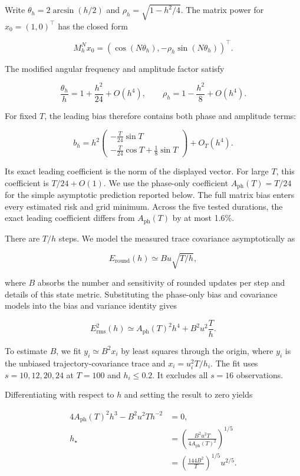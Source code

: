 \documentclass[
11pt
]{article}
\begin{document}
Write \(\theta_h=2\arcsin(h/2)\) and
\(\rho_h=\sqrt{1-h^2/4}\). The matrix power for \(x_0=(1,0)^\top\)
has the closed form

\[
M_h^Nx_0=(\cos(N\theta_h),-\rho_h\sin(N\theta_h))^\top.
\]

The modified angular frequency and amplitude factor satisfy

\[
\frac{\theta_h}{h}=1+\frac{h^2}{24}+O(h^4),
\qquad \rho_h=1-\frac{h^2}{8}+O(h^4).
\]

For fixed \(T\), the leading bias therefore contains both phase and
amplitude terms:

\[
b_h=h^2\begin{pmatrix}
-\frac{T}{24}\sin T\\[2pt]
-\frac{T}{24}\cos T+\frac18\sin T
\end{pmatrix}+O_T(h^4).
\]

Its exact leading coefficient is the norm of the displayed vector. For
large \(T\), this coefficient is \(T/24+O(1)\). We use the phase-only
coefficient \(A_{\mathrm{ph}}(T)=T/24\) for the simple asymptotic
prediction reported below. The full matrix bias enters every estimated
risk and grid minimum. Across the five tested durations, the exact
leading coefficient differs from \(A_{\mathrm{ph}}(T)\) by at most
1.6\%.

There are \(T/h\) steps. We model the measured trace covariance
asymptotically as

\[
E_{\mathrm{round}}(h)\simeq Bu\sqrt{T/h},
\]

where \(B\) absorbs the number and sensitivity of rounded updates per
step and details of this state metric. Substituting the phase-only bias
and covariance models into the bias and variance identity gives

\[
E_{\mathrm{rms}}^2(h)\simeq A_{\mathrm{ph}}(T)^2h^4+B^2u^2\frac{T}{h}.
\]

To estimate \(B\), we fit \(y_i\simeq B^2x_i\) by least squares through
the origin, where \(y_i\) is the unbiased trajectory-covariance trace
and \(x_i=u_i^2T/h_i\). The fit uses \(s=10,12,20,24\) at \(T=100\)
and \(h_i\leq0.2\). It excludes all \(s=16\) observations.

Differentiating with respect to \(h\) and setting the result to zero
yields

\[
\begin{aligned}
4A_{\mathrm{ph}}(T)^2h^3-B^2u^2T h^{-2}&=0,\\
h_{\star}&=\left(\frac{B^2u^2T}{4A_{\mathrm{ph}}(T)^2}\right)^{1/5}\\
&=\left(\frac{144B^2}{T}\right)^{1/5}u^{2/5}.
\end{aligned}
\]
\end{document}
